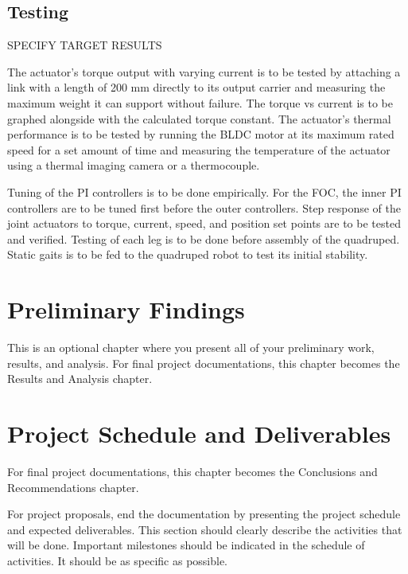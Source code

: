\documentclass[english]{upeeei}
\begin{document}
\section{Testing}

SPECIFY TARGET RESULTS

The actuator's torque output with varying current is to be tested by attaching a link with a length of 200 mm directly to its output carrier and measuring the maximum weight it can support without failure. The torque vs current is to be graphed alongside with the calculated torque constant. The actuator's thermal performance is to be tested by running the BLDC motor at its maximum rated speed for a set amount of time and measuring the temperature of the actuator using a thermal imaging camera or a thermocouple.

Tuning of the PI controllers is to be done empirically. For the FOC, the inner PI controllers are to be tuned first before the outer controllers. Step response of the joint actuators to torque, current, speed, and position set points are to be tested and verified. Testing of each leg is to be done before assembly of the quadruped. Static gaits is to be fed to the quadruped robot to test its initial stability.

\cleardoublepage{}

\chapter{Preliminary Findings\label{cha:Prelims}}

This is an optional chapter where you present all of your preliminary
work, results, and analysis. For final project documentations, this
chapter becomes the Results and Analysis chapter.

\cleardoublepage{}

\chapter{Project Schedule and Deliverables\label{cha:Project-Sked}}

For final project documentations, this chapter becomes the Conclusions
and Recommendations chapter.

For project proposals, end the documentation by presenting the project
schedule and expected deliverables. This section should clearly describe
the activities that will be done. Important milestones should be indicated
in the schedule of activities. It should be as specific as possible. 
\end{document}
